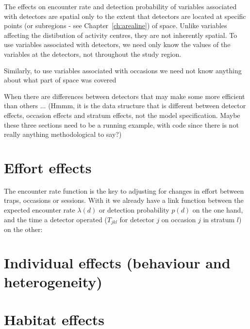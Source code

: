 \documentclass[graybox,envcountchap,sectrefs]{SpringerStyleFiles/styles/svmono}\usepackage[]{graphicx}\usepackage[]{color}
\begin{document}
The effects on encounter rate and detection probability of variables associated with detectors are spatial only to the extent that detectors are located at specific points (or subregions - see Chapter~\ref{ch:arealine}) of space. Unlike variables affecting the distibution of activity centres, they are not inherently spatial. To use variables associated with detectors, we need only know the values of the variables at the detectors, not throughout the study region. 

Similarly, to use variables associated with occasions we need not know anything about what part of space was covered 

When there are differences between detectors that may make some more efficient than others ... (Hmmm, it is the data structure that is different between detector effects, occasion effects and stratum effects, not the model specification. Maybe these three sections need to be a running example, with code since there is not really anything methodological to say?)



\section{Effort effects}

The encounter rate function is the key to adjusting for changes in effort between traps, occasions or sessions. With it we already have a link function between the expected encounter rate $\lambda(d)$ or detection probability $p(d)$ on the one hand, and the time a detector operated ($T_{jkl}$ for detector $j$ on occasion $j$ in stratum $l$) on the other:

\section{Individual effects (behaviour and heterogeneity)}


\section{Habitat effects} %
\end{document}
